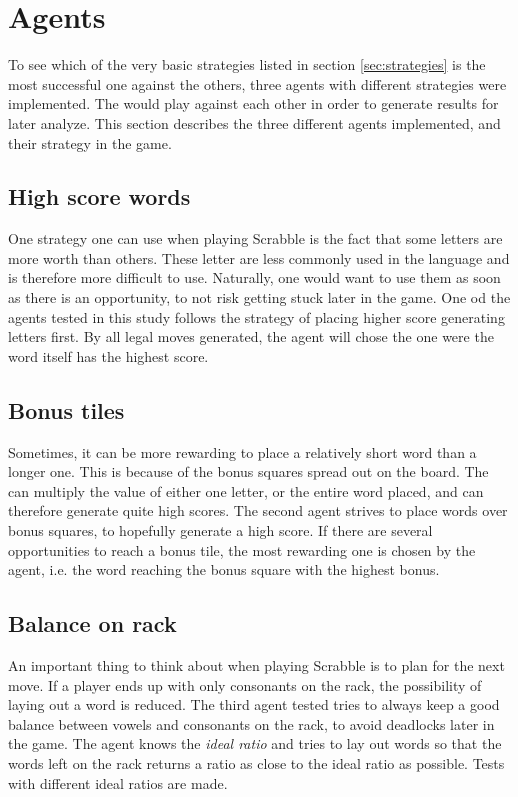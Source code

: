 \documentclass[a4paper, 12pt]{report}
\begin{document}
\section{Agents}

To see which of the very basic strategies listed in section \ref{sec:strategies} is the most successful one against the others, three agents with different strategies were implemented. The would play against each other in order to generate results for later analyze. This section describes the three different agents implemented, and their strategy in the game.

\subsection{High score words}
One strategy one can use when playing Scrabble is the fact that some letters are more worth than others. These letter are less commonly used in the language and is therefore more difficult to use. Naturally, one would want to use them as soon as there is an opportunity, to not risk getting stuck later in the game. One od the agents tested in this study follows the strategy of placing higher score generating letters first. By all legal moves generated, the agent will chose the one were the word itself has the highest score.

\subsection{Bonus tiles}
Sometimes, it can be more rewarding to place a relatively short word than a longer one. This is because of the bonus squares spread out on the board. The can multiply the value of either one letter, or the entire word placed, and can therefore generate quite high scores. The second agent strives to place words over bonus squares, to hopefully generate a high score. If there are several opportunities to reach a bonus tile, the most rewarding one is chosen by the agent, i.e. the word reaching the bonus square with the highest bonus.

\subsection{Balance on rack}
An important thing to think about when playing Scrabble is to plan for the next move. If a player ends up with only consonants on the rack, the possibility of laying out a word is reduced. The third agent tested tries to always keep a good balance between vowels and consonants on the rack, to avoid deadlocks later in the game. The agent knows the \emph{ideal ratio} and tries to lay out words so that the words left on the rack returns a ratio as close to the ideal ratio as possible. Tests with different ideal ratios are made.
\end{document}
